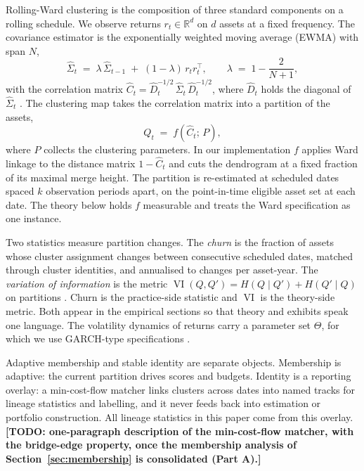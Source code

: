 \documentclass[11pt]{article}
\theoremstyle{remark}
\newcommand{\R}{\mathbb{R}}
\newcommand{\VI}{\operatorname{VI}}
\newcommand{\TODO}[1]{\textbf{[TODO: #1]}}
\begin{document}
Rolling-Ward clustering is the composition of three standard components on a
rolling schedule. We observe returns $r_t \in \R^d$ on $d$ assets at a fixed
frequency. The covariance estimator is the exponentially weighted moving
average (EWMA) with span $N$,
\begin{equation}
\widehat{\Sigma}_t \;=\; \lambda\, \widehat{\Sigma}_{t-1}
\;+\; (1-\lambda)\, r_t r_t^{\top},
\qquad \lambda \;=\; 1 - \frac{2}{N+1},
\label{eq:ewma}
\end{equation}
with the correlation matrix
$\widehat{C}_t = \widehat{D}_t^{-1/2}\, \widehat{\Sigma}_t\, \widehat{D}_t^{-1/2}$,
where $\widehat{D}_t$ holds the diagonal of $\widehat{\Sigma}_t$
\citep{riskmetrics1996}. The clustering map takes the correlation matrix into a
partition of the assets,
\begin{equation}
Q_t \;=\; f\!\left(\widehat{C}_t;\, P\right),
\label{eq:clustermap}
\end{equation}
where $P$ collects the clustering parameters. In our implementation $f$ applies
Ward linkage \citep{ward1963hierarchical} to the distance matrix
$1-\widehat{C}_t$ and cuts the dendrogram at a fixed fraction of its maximal
merge height. The partition is re-estimated at scheduled dates spaced $k$
observation periods apart, on the point-in-time eligible asset set at each
date. The theory below holds $f$ measurable and treats the Ward specification
as one instance.

Two statistics measure partition changes. The \emph{churn} is the fraction of
assets whose cluster assignment changes between consecutive scheduled dates,
matched through cluster identities, and annualised to changes per asset-year.
The \emph{variation of information} is the metric
$\VI(Q, Q') = H(Q \mid Q') + H(Q' \mid Q)$ on partitions
\citep{meila2007comparing}. Churn is the practice-side statistic and $\VI$ is
the theory-side metric. Both appear in the empirical sections so that theory
and exhibits speak one language. The volatility dynamics of returns carry a
parameter set $\Theta$, for which we use GARCH-type specifications
\citep{bollerslev1986generalized}.

Adaptive membership and stable identity are separate objects. Membership is
adaptive: the current partition drives scores and budgets. Identity is a
reporting overlay: a min-cost-flow matcher links clusters across dates into
named tracks for lineage statistics and labelling, and it never feeds back into
estimation or portfolio construction. All lineage statistics in this paper come
from this overlay. \TODO{one-paragraph description of the min-cost-flow
matcher, with the bridge-edge property, once the membership analysis of
Section~\ref{sec:membership} is consolidated (Part A).}
\end{document}
